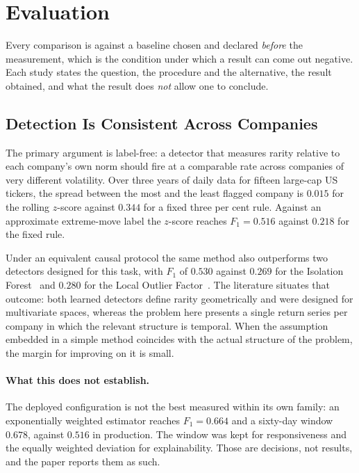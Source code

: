 \documentclass[runningheads]{llncs}
\begin{document}
\section{Evaluation}
\label{sec:eval}

Every comparison is against a baseline chosen and declared \emph{before} the measurement,
which is the condition under which a result can come out negative. Each study states the
question, the procedure and the alternative, the result obtained, and what the result does
\emph{not} allow one to conclude.

\subsection{Detection Is Consistent Across Companies}

The primary argument is label-free: a detector that measures rarity relative to each
company's own norm should fire at a comparable rate across companies of very different
volatility. Over three years of daily data for fifteen large-cap US tickers, the spread
between the most and the least flagged company is $0.015$ for the rolling $z$-score against
$0.344$ for a fixed three per cent rule. Against an approximate extreme-move label the
$z$-score reaches $F_1 = 0.516$ against $0.218$ for the fixed rule.

Under an equivalent causal protocol the same method also outperforms two detectors designed
for this task, with $F_1$ of $0.530$ against $0.269$ for the Isolation
Forest~\cite{liu2008isolation} and $0.280$ for the Local Outlier
Factor~\cite{breunig2000lof}. The literature situates that outcome: both learned detectors
define rarity geometrically and were designed for multivariate spaces, whereas the problem
here presents a single return series per company in which the relevant structure is
temporal. When the assumption embedded in a simple method coincides with the actual
structure of the problem, the margin for improving on it is small.

\paragraph{What this does not establish.} The deployed configuration is not the best
measured within its own family: an exponentially weighted estimator reaches $F_1 = 0.664$
and a sixty-day window $0.678$, against $0.516$ in production. The window was kept for
responsiveness and the equally weighted deviation for explainability. Those are decisions,
not results, and the paper reports them as such.
\end{document}
